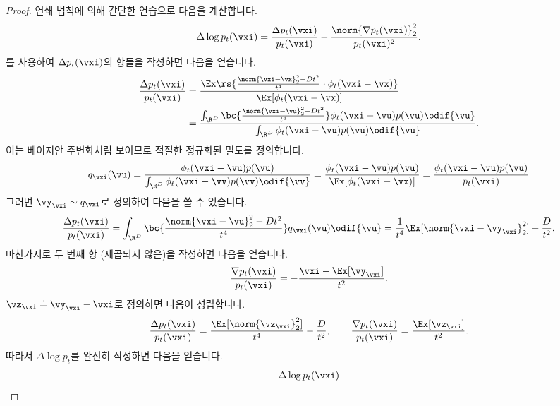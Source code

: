 \documentclass[../../book-main_ko.tex]{subfiles}
\begin{document}
\begin{proof}
    연쇄 법칙에 의해 간단한 연습으로 다음을 계산합니다.
    \begin{equation}
        \Delta \log p_{t}(\vxi) = \frac{\Delta p_{t}(\vxi)}{p_{t}(\vxi)} - \frac{\norm{\nabla p_{t}(\vxi)}_{2}^{2}}{p_{t}(\vxi)^{2}}.
    \end{equation}
    를 사용하여 \(\Delta p_{t}(\vxi)\)의 항들을 작성하면 다음을 얻습니다.
    \begin{align}
        \frac{\Delta p_{t}(\vxi)}{p_{t}(\vxi)}
        &= \frac{\Ex\rs{\frac{\norm{\vxi - \vx}_{2}^{2} - Dt^{2}}{t^{4}} \cdot \phi_{t}(\vxi - \vx)}}{\Ex[\phi_{t}(\vxi - \vx)]} \\
        &= \frac{\int_{\R^{D}}\bc{\frac{\norm{\vxi - \vu}_{2}^{2} - Dt^{2}}{t^{4}}}\phi_{t}(\vxi - \vu)p(\vu)\odif{\vu}}{\int_{\R^{D}}\phi_{t}(\vxi - \vu)p(\vu)\odif{\vu}}.
    \end{align}
    이는 베이지안 주변화처럼 보이므로 적절한 정규화된 밀도를 정의합니다.
    \begin{equation}
        q_{\vxi}(\vu) = \frac{\phi_{t}(\vxi - \vu)p(\vu)}{\int_{\R^{D}}\phi_{t}(\vxi - \vv)p(\vv)\odif{\vv}} = \frac{\phi_{t}(\vxi - \vu)p(\vu)}{\Ex[\phi_{t}(\vxi - \vx)]} = \frac{\phi_{t}(\vxi - \vu)p(\vu)}{p_{t}(\vxi)}
    \end{equation}
    그러면 \(\vy_{\vxi} \sim q_{\vxi}\)로 정의하여 다음을 쓸 수 있습니다.
    \begin{equation}
        \frac{\Delta p_{t}(\vxi)}{p_{t}(\vxi)} = \int_{\R^{D}}\bc{\frac{\norm{\vxi - \vu}_{2}^{2} - Dt^{2}}{t^{4}}}q_{\vxi}(\vu)\odif{\vu} = \frac{1}{t^{4}}\Ex[\norm{\vxi - \vy_{\vxi}}_{2}^{2}] - \frac{D}{t^{2}}.
    \end{equation}
    마찬가지로 두 번째 항 (제곱되지 않은)을 작성하면 다음을 얻습니다.
    \begin{equation}
        \frac{\nabla p_{t}(\vxi)}{p_{t}(\vxi)} = -\frac{\vxi - \Ex[\vy_{\vxi}]}{t^{2}}.
    \end{equation}
    \(\vz_{\vxi} \doteq \vy_{\vxi} - \vxi\)로 정의하면 다음이 성립합니다.
    \begin{equation}
        \frac{\Delta p_{t}(\vxi)}{p_{t}(\vxi)} = \frac{\Ex[\norm{\vz_{\vxi}}_{2}^{2}]}{t^{4}} - \frac{D}{t^{2}}, \qquad \frac{\nabla p_{t}(\vxi)}{p_{t}(\vxi)} = \frac{\Ex[\vz_{\vxi}]}{t^{2}}.
    \end{equation}
    따라서 \(\Delta \log p_{t}\)를 완전히 작성하면 다음을 얻습니다.
    \begin{align}
        \Delta \log p_{t}(\vxi)

\end{align}
\end{proof}
\end{document}
